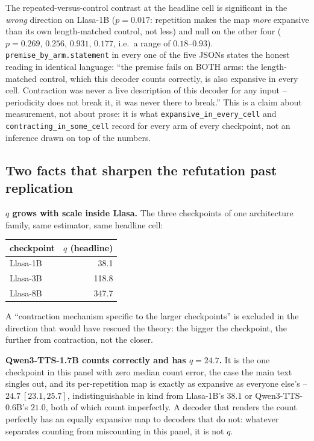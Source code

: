 \documentclass[11pt]{article}
\begin{document}
The repeated-versus-control contrast at the headline cell is significant in
the \emph{wrong} direction on Llasa-1B ($p=0.017$: repetition makes the map
\emph{more} expansive than its own length-matched control, not less) and null
on the other four ($p=0.269$, $0.256$, $0.931$, $0.177$, i.e.\ a range
of $0.18$--$0.93$). \texttt{premise\_by\_arm.statement} in every
one of the five JSONs states the honest reading in identical language: ``the
premise fails on BOTH arms: the length-matched control, which this decoder
counts correctly, is also expansive in every cell. Contraction was never a
live description of this decoder for any input -- periodicity does not break
it, it was never there to break.'' This is a claim about measurement, not
about prose: it is what \texttt{expansive\_in\_every\_cell} and
\texttt{contracting\_in\_some\_cell} record for every arm of every checkpoint,
not an inference drawn on top of the numbers.

\subsection{Two facts that sharpen the refutation past replication}
\label{sec:s5-jacobian-scale}

\noindent\textbf{$q$ grows with scale inside Llasa.} The three checkpoints of
one architecture family, same estimator, same headline cell:

\begin{center}
\begin{tabular}{lr}
\toprule
checkpoint & $q$ (headline) \\
\midrule
Llasa-1B & 38.1 \\
Llasa-3B & 118.8 \\
Llasa-8B & 347.7 \\
\bottomrule
\end{tabular}
\end{center}

A ``contraction mechanism specific to the larger checkpoints'' is excluded in
the direction that would have rescued the theory: the bigger the checkpoint,
the further from contraction, not the closer.

\noindent\textbf{Qwen3-TTS-1.7B counts correctly and has $q=24.7$.} It is the
one checkpoint in this panel with zero median count error, the case the main
text singles out, and its per-repetition map is exactly as
expansive as everyone else's -- $24.7\ [23.1,25.7]$, indistinguishable in kind
from Llasa-1B's $38.1$ or Qwen3-TTS-0.6B's $21.0$, both of which count
imperfectly. A decoder that renders the count perfectly has an equally
expansive map to decoders that do not: whatever separates counting from
miscounting in this panel, it is not $q$.
\end{document}
